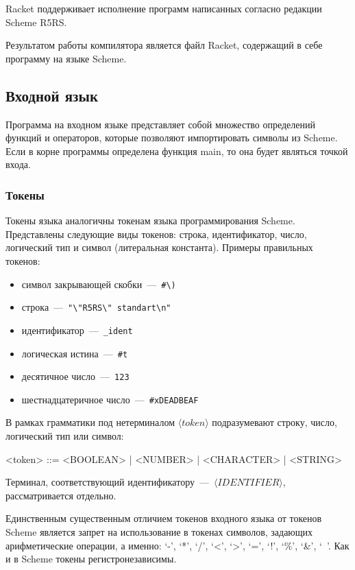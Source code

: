\documentclass[12pt,a4paper,oneside]{extarticle}
\begin{document}
        Racket поддерживает исполнение программ написанных согласно редакции Scheme R5RS.

        Результатом работы компилятора является файл Racket, содержащий в себе программу на языке Scheme.
    \clearpage

    \subsection{Входной язык}
        Программа на входном языке представляет собой множество определений функций и операторов, которые позволяют импортировать символы из Scheme.
        Если в корне программы определена функция main, то она будет являться точкой входа.

        \subsubsection{Токены}
            Токены языка аналогичны токенам языка программирования Scheme.
            Представлены следующие виды токенов: строка, идентификатор, число, логический тип и символ (литеральная константа). Примеры правильных токенов: 

            \begin{itemize}
                \item символ закрывающей скобки~---~\lstinline$#\)$
                \item строка~---~\lstinline$"\"R5RS\" standart\n"$
                \item идентификатор~---~\lstinline$_ident$
                \item логическая истина~---~\lstinline$#t$
                \item десятичное число~---~\lstinline$123$
                \item шестнадцатеричное число~---~\lstinline$#xDEADBEAF$
            \end{itemize}

            В рамках грамматики под нетерминалом $\langle token\rangle$ подразумевают строку, число, логический тип или символ:
            \begin{grammar}
                <token> ::= <BOOLEAN> | <NUMBER> | <CHARACTER> | <STRING>
            \end{grammar}
            Терминал, соответствующий идентификатору~---~$\langle IDENTIFIER \rangle$, рассматривается отдельно.

            Единственным существенным отличием токенов входного языка от токенов Scheme является запрет на использование в токенах символов, задающих арифметические операции, а именно: `-', `*', `/', `<', `>', `=', `!', `\%', `\&', `~'. Как и в Scheme токены регистронезависимы.      
\end{document}
